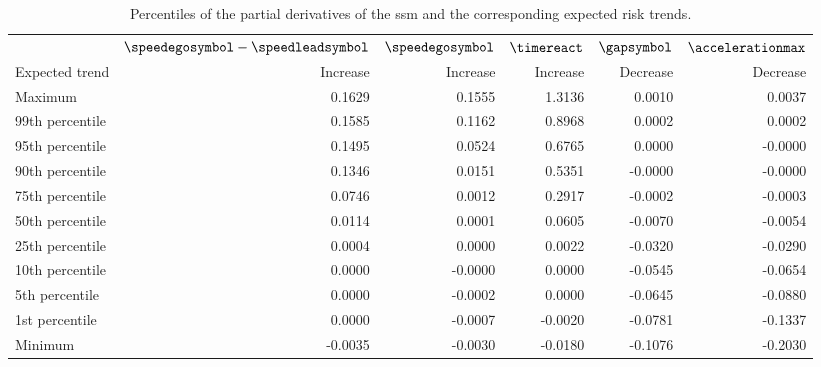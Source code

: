\begin{table}
	\centering
	\caption{Percentiles of the partial derivatives of the \ac{ssm} and the corresponding expected risk trends.}
	\label{tab:trends}
	\begin{tabular}{lrrrrr}
		\toprule
		& $\speedegosymbol-\speedleadsymbol$ & $\speedegosymbol$ & $\timereact$ & $\gapsymbol$ & $\accelerationmax$ \\
		\otoprule
		Expected trend & Increase & Increase & Increase & Decrease & Decrease \\
		Maximum         &  0.1629 &  0.1555 &  1.3136 &  0.0010 &  0.0037 \\
		99th percentile &  0.1585 &  0.1162 &  0.8968 &  0.0002 &  0.0002 \\
		95th percentile &  0.1495 &  0.0524 &  0.6765 &  0.0000 & -0.0000 \\
		90th percentile &  0.1346 &  0.0151 &  0.5351 & -0.0000 & -0.0000 \\
		75th percentile &  0.0746 &  0.0012 &  0.2917 & -0.0002 & -0.0003 \\
		50th percentile &  0.0114 &  0.0001 &  0.0605 & -0.0070 & -0.0054 \\
		25th percentile &  0.0004 &  0.0000 &  0.0022 & -0.0320 & -0.0290 \\
		10th percentile &  0.0000 & -0.0000 &  0.0000 & -0.0545 & -0.0654 \\
		 5th percentile &  0.0000 & -0.0002 &  0.0000 & -0.0645 & -0.0880 \\
		 1st percentile &  0.0000 & -0.0007 & -0.0020 & -0.0781 & -0.1337 \\
		Minimum         & -0.0035 & -0.0030 & -0.0180 & -0.1076 & -0.2030 \\
		\bottomrule
	\end{tabular}
\end{table}

